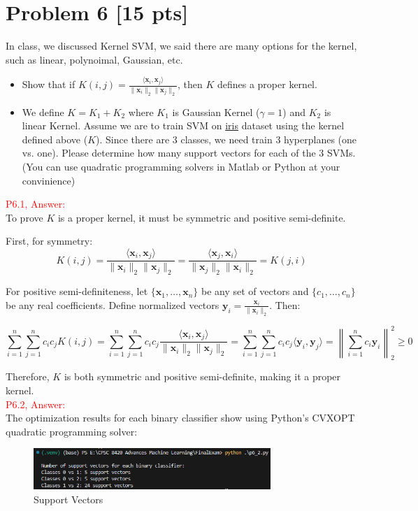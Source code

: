\documentclass[11pt]{article}
\newcommand{\vct}[1]{\mathbf{#1}}
\def \vx {\vct{x}}
\def \vy {\vct{y}}
\begin{document}
\section*{Problem 6 [15 pts]}
In class, we discussed Kernel SVM, we said there are many options for the kernel, such as linear, polynoimal, Gaussian, etc.
\begin{itemize}
	\item Show that if $K(i,j)=\frac{\langle \vx_i,\vx_j\rangle}{\|\vx_i\|_2\|\vx_j\|_2}$, then $K$ defines a proper kernel.
	\item We define $K=K_1+K_2$ where $K_1$ is Gaussian Kernel ($\gamma=1$) and $K_2$ is linear Kernel. Assume we are to train SVM on \href{https://en.wikipedia.org/wiki/Iris_flower_data_set}{iris} dataset using the kernel defined above ($K$). Since there are 3 classes, we need train 3 hyperplanes (one vs. one). Please determine how many support vectors for each of the 3 SVMs. (You can use quadratic programming solvers in Matlab or Python at your convinience)
\end{itemize}


\textcolor{red}{P6.1, Answer:}\\

To prove $K$ is a proper kernel, it must be symmetric and positive semi-definite.

First, for symmetry:
\[
K(i,j) = \frac{\langle \vx_i,\vx_j\rangle}{\|\vx_i\|_2\|\vx_j\|_2} = \frac{\langle \vx_j,\vx_i\rangle}{\|\vx_j\|_2\|\vx_i\|_2} = K(j,i)
\]

For positive semi-definiteness, let $\{\vx_1,\ldots,\vx_n\}$ be any set of vectors and $\{c_1,\ldots,c_n\}$ be any real coefficients. Define normalized vectors $\vy_i = \frac{\vx_i}{\|\vx_i\|_2}$. Then:

\[\sum_{i=1}^n\sum_{j=1}^n c_ic_jK(i,j) = \sum_{i=1}^n\sum_{j=1}^n c_ic_j\frac{\langle \vx_i,\vx_j\rangle}{\|\vx_i\|_2\|\vx_j\|_2} = \sum_{i=1}^n\sum_{j=1}^n c_ic_j\langle \vy_i,\vy_j\rangle = \left\|\sum_{i=1}^n c_i\vy_i\right\|_2^2 \geq 0\]

Therefore, $K$ is both symmetric and positive semi-definite, making it a proper kernel.\\

\textcolor{red}{P6.2, Answer:}\\

The optimization results for each binary classifier show using Python's CVXOPT quadratic programming solver:

\begin{figure}[h]
	\centering
	\includegraphics[width=0.8\textwidth]{p6_2.png}
	\caption{Support Vectors}
	\label{fig:p6_2}
	\end{figure}
\end{document}
